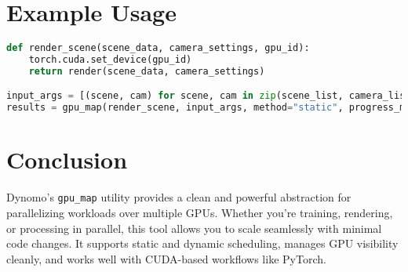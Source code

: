 \documentclass{article}
\begin{document}
\section*{Example Usage}

\begin{lstlisting}[language=Python]
def render_scene(scene_data, camera_settings, gpu_id):
    torch.cuda.set_device(gpu_id)
    return render(scene_data, camera_settings)

input_args = [(scene, cam) for scene, cam in zip(scene_list, camera_list)]
results = gpu_map(render_scene, input_args, method="static", progress_msg="Rendering Scenes")
\end{lstlisting}

\section*{Conclusion}

Dynomo's \texttt{gpu\_map} utility provides a clean and powerful abstraction for parallelizing workloads over multiple GPUs. Whether you're training, rendering, or processing in parallel, this tool allows you to scale seamlessly with minimal code changes. It supports static and dynamic scheduling, manages GPU visibility cleanly, and works well with CUDA-based workflows like PyTorch.
\end{document}
